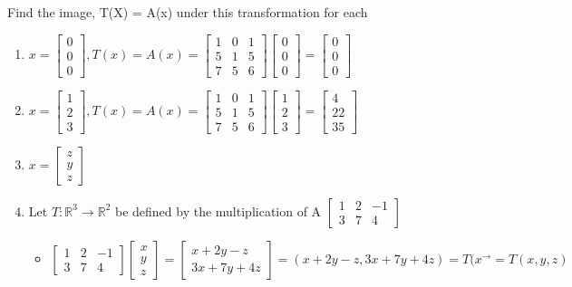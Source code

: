 \documentclass[11pt]{article}
\begin{document}
Find the image, T(X) = A(x) under this transformation for each
\begin{enumerate}
\item \(x = \begin{bmatrix}0\\0\\0\end{bmatrix}, T(x) = A(x) = \begin{bmatrix}1&0&1\\5&1&5\\7&5&6\end{bmatrix}\begin{bmatrix}0\\0\\0\end{bmatrix} = \begin{bmatrix}0\\0\\0\end{bmatrix}\)
\item \(x = \begin{bmatrix}1\\2\\3\end{bmatrix}, T(x) = A(x) = \begin{bmatrix}1&0&1\\5&1&5\\7&5&6\end{bmatrix}\begin{bmatrix}1\\2\\3\end{bmatrix} = \begin{bmatrix}4\\22\\35\end{bmatrix}\)
\item \(x = \begin{bmatrix}z\\y\\z\end{bmatrix}\)

\item Let \(T: \mathbb{R}^{3} \rightarrow{} \mathbb{R}^{2}\) be defined by the multiplication of A \(\begin{bmatrix}1&2&-1\\3&7&4\end{bmatrix}\)
\begin{itemize}
\item \(\begin{bmatrix}1&2&-1\\3&7&4\end{bmatrix}\begin{bmatrix}x\\y\\z\end{bmatrix}=\begin{bmatrix}x+2y-z\\3x+7y+4z\end{bmatrix} = (x+2y-z, 3x+7y+4z) = T(x^{\rightarrow{}} = T(x,y,z)\)


\end{itemize}
\end{enumerate}
\end{document}
